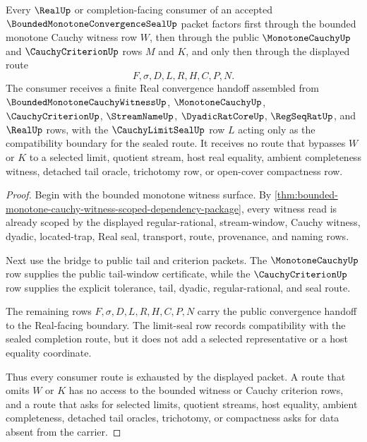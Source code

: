 \begin{theorem}
\label{thm:bounded-monotone-convergence-seal-public-handoff}
Every $\RealUp$ or completion-facing consumer of an accepted $\BoundedMonotoneConvergenceSealUp$ packet factors first through the bounded monotone Cauchy witness row $W$, then through the public $\MonotoneCauchyUp$ and $\CauchyCriterionUp$ rows $M$ and $K$, and only then through the displayed route
$$
F,\sigma,D,L,R,H,C,P,N.
$$
The consumer receives a finite Real convergence handoff assembled from $\BoundedMonotoneCauchyWitnessUp$, $\MonotoneCauchyUp$, $\CauchyCriterionUp$, $\StreamNameUp$, $\DyadicRatCoreUp$, $\RegSeqRatUp$, and $\RealUp$ rows, with the $\CauchyLimitSealUp$ row $L$ acting only as the compatibility boundary for the sealed route. It receives no route that bypasses $W$ or $K$ to a selected limit, quotient stream, host real equality, ambient completeness witness, detached tail oracle, trichotomy row, or open-cover compactness row.
\end{theorem}
\begin{proof}
Begin with the bounded monotone witness surface. By \autoref{thm:bounded-monotone-cauchy-witness-scoped-dependency-package}, every witness read is already scoped by the displayed regular-rational, stream-window, Cauchy witness, dyadic, located-trap, Real seal, transport, route, provenance, and naming rows.

Next use the bridge to public tail and criterion packets. The $\MonotoneCauchyUp$ row supplies the public tail-window certificate, while the $\CauchyCriterionUp$ row supplies the explicit tolerance, tail, dyadic, regular-rational, and seal route.

The remaining rows $F,\sigma,D,L,R,H,C,P,N$ carry the public convergence handoff to the Real-facing boundary. The limit-seal row records compatibility with the sealed completion route, but it does not add a selected representative or a host equality coordinate.

Thus every consumer route is exhausted by the displayed packet. A route that omits $W$ or $K$ has no access to the bounded witness or Cauchy criterion rows, and a route that asks for selected limits, quotient streams, host equality, ambient completeness, detached tail oracles, trichotomy, or compactness asks for data absent from the carrier.
\end{proof}

